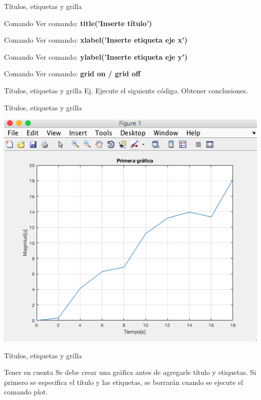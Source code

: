 \documentclass{bredelebeamer}
\begin{document}
\begin{frame}{Títulos, etiquetas y grilla}
\begin{exampleblock}{Comando}
Ver comando: \textbf{title('Inserte título')}
\end{exampleblock}
\begin{exampleblock}{Comando}
Ver comando: \textbf{xlabel('Inserte etiqueta eje x')}
\end{exampleblock}
\begin{exampleblock}{Comando}
Ver comando: \textbf{ylabel('Inserte etiqueta eje y')}
\end{exampleblock}
\begin{exampleblock}{Comando}
Ver comando: \textbf{grid on / grid off}
\end{exampleblock}
\end{frame}

\begin{frame}{Títulos, etiquetas y grilla}
Ej. Ejecute el siguiente código. Obtener conclusiones.

\end{frame}

\begin{frame}{Títulos, etiquetas y grilla}
\begin{center}
\includegraphics[scale=0.35]{images/pantalla15.png}
\end{center}
\end{frame}

\begin{frame}{Títulos, etiquetas y grilla}
\begin{alertblock}{Tener en cuenta}
Se debe crear una gráfica antes de agregarle título y etiquetas. Si primero se especifica el título y las etiquetas, se borrarán cuando se ejecute el comando plot.
\end{alertblock}
\end{frame}
\end{document}
